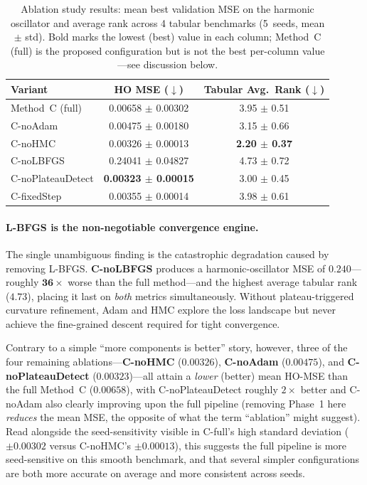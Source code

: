 \documentclass[11pt]{article}
\theoremstyle{definition}
\begin{document}
\begin{table}[H]
\centering
\caption{Ablation study results: mean best validation MSE on the
         harmonic oscillator and average rank across 4 tabular
         benchmarks (5~seeds, mean $\pm$ std).
         Bold marks the lowest (best) value in each column;
         Method~C (full) is the proposed configuration but is not
         the best per-column value---see discussion below.}
\label{tab:ablation}
\renewcommand{\arraystretch}{1.25}
\begin{tabular}{lcc}
\toprule
\textbf{Variant} & \textbf{HO MSE} ($\downarrow$)
                 & \textbf{Tabular Avg.\ Rank} ($\downarrow$) \\
\midrule
Method~C (full)         & 0.00658 $\pm$ 0.00302 & 3.95 $\pm$ 0.51 \\
C-noAdam                & 0.00475 $\pm$ 0.00180 & 3.15 $\pm$ 0.66 \\
C-noHMC                 & 0.00326 $\pm$ 0.00013 & \textbf{2.20 $\pm$ 0.37} \\
C-noLBFGS               & 0.24041 $\pm$ 0.04827 & 4.73 $\pm$ 0.72 \\
C-noPlateauDetect       & \textbf{0.00323 $\pm$ 0.00015} & 3.00 $\pm$ 0.45 \\
C-fixedStep             & 0.00355 $\pm$ 0.00014 & 3.98 $\pm$ 0.61 \\
\bottomrule
\end{tabular}
\end{table}


\paragraph{L-BFGS is the non-negotiable convergence engine.}
The single unambiguous finding is the catastrophic degradation
caused by removing L-BFGS\@. \textbf{C-noLBFGS} produces a
harmonic-oscillator MSE of $0.240$---roughly $\mathbf{36\times}$
worse than the full method---and the highest average tabular rank
($4.73$), placing it last on \emph{both} metrics simultaneously.
Without plateau-triggered curvature refinement, Adam and HMC
explore the loss landscape but never achieve the fine-grained
descent required for tight convergence.

Contrary to a simple ``more components is better'' story, however,
three of the four remaining ablations---\textbf{C-noHMC} ($0.00326$),
\textbf{C-noAdam} ($0.00475$), and \textbf{C-noPlateauDetect}
($0.00323$)---all attain a \emph{lower} (better) mean HO-MSE than
the full Method~C ($0.00658$), with C-noPlateauDetect roughly
$2\times$ better and C-noAdam also clearly improving upon the
full pipeline (removing Phase~1 here \emph{reduces} the mean MSE,
the opposite of what the term ``ablation'' might suggest). Read
alongside the seed-sensitivity visible in C-full's high standard
deviation ($\pm 0.00302$ versus C-noHMC's $\pm 0.00013$), this
suggests the full pipeline is more seed-sensitive on this smooth
benchmark, and that several simpler configurations are both more
accurate on average and more consistent across seeds.
\end{document}
